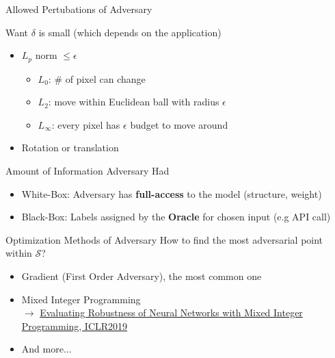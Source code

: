 \documentclass{beamer}
\begin{document}
\begin{frame}{Allowed Pertubations of Adversary}
  \begin{block}{Want}
    $\delta$ is small (which depends on the application)
  \end{block}
  \begin{itemize}
    \item $L_p$ norm $\leq \epsilon$
      \begin{itemize}
        \item $L_0$: \# of pixel can change
        \item $L_2$: move within Euclidean ball with radius $\epsilon$
        \item $L_\infty$: every pixel has $\epsilon$ budget to move around
      \end{itemize}
    \item Rotation or translation
  \end{itemize}
\end{frame}

\begin{frame}{Amount of Information Adversary Had}
    \begin{itemize}
      \item White-Box: Adversary has \textbf{full-access} to the model (structure, weight)
      \item Black-Box: Labels assigned by the \textbf{Oracle} for chosen input (e.g API call)
    \end{itemize}
\end{frame}

\begin{frame}{Optimization Methods of Adversary}
  How to find the most adversarial point within $\mathcal{S}$?
  \begin{itemize}
    \item Gradient (First Order Adversary), the most common one
    \item Mixed Integer Programming \\
      $\rightarrow$ \href{https://openreview.net/forum?id=HyGIdiRqtm}{Evaluating Robustness of Neural Networks with Mixed Integer Programming, ICLR2019}
      
    \item And more...
  \end{itemize}
\end{frame}
\end{document}
